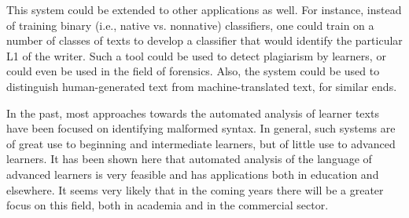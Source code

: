 \documentclass[main.tex]{subfiles}
\begin{document}
This system could be extended to other applications as well. For instance, instead of training binary (i.e., native vs. nonnative) classifiers, one could train on a number of classes of texts to develop a classifier that would identify the particular L1 of the writer. Such a tool could be used to detect plagiarism by learners, or could even be used in the field of forensics. Also, the system could be used to distinguish human-generated text from machine-translated text, for similar ends.

In the past, most approaches towards the automated analysis of learner texts have been focused on identifying malformed syntax. In general, such systems are of great use to beginning and intermediate learners, but of little use to advanced learners. It has been shown here that automated analysis of the language of advanced learners is very feasible and has applications both in education and elsewhere. It seems very likely that in the coming years there will be a greater focus on this field, both in academia and in the commercial sector. 

\biblio
\end{document}
